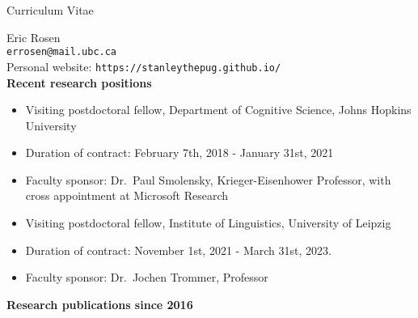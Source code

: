 \documentclass[11pt]{article}
\newcommand{\bo}[1]{\textbf{#1}}
\newcommand{\bi}{\begin{itemize}}
\newcommand{\ii}{\item}
\newcommand{\ei}{\end{itemize}}
\begin{document}
\begin{center}
\LARGE
Curriculum Vitae
\normalsize
\end{center}
\medskip

\noindent Eric Rosen \\
\verb+errosen@mail.ubc.ca+ \\
Personal website: \verb+https://stanleythepug.github.io/+\\

\noindent \textbf{Recent research positions}
\bi
\ii[] Visiting postdoctoral fellow, Department of Cognitive Science, Johns Hopkins University
\ii[] Duration of contract: February 7th, 2018 - January 31st, 2021
\ii[] Faculty sponsor: Dr.\ Paul Smolensky, Krieger-Eisenhower Professor, with cross appointment at Microsoft Research
\ei

\bi
\ii[] Visiting postdoctoral fellow, Institute of Linguistics, University of Leipzig
\ii[] Duration of contract: November 1st, 2021 - March 31st, 2023.
\ii[] Faculty sponsor: Dr.\ Jochen Trommer, Professor
\ei

\noindent \bo{Research publications since 2016}
\end{document}
